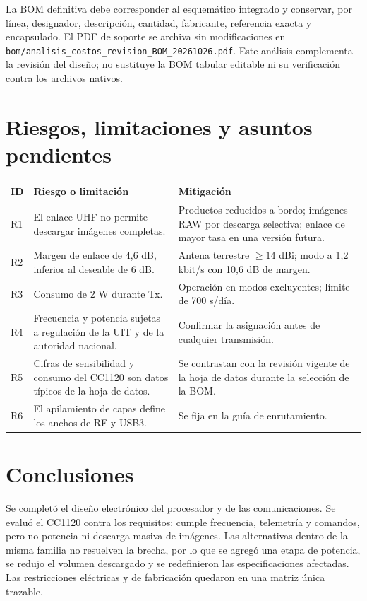 \documentclass[11pt,letterpaper]{article}
\begin{document}
La BOM definitiva debe corresponder al esquemático integrado y conservar, por línea, designador, descripción, cantidad, fabricante, referencia exacta y encapsulado. El PDF de soporte se archiva sin modificaciones en \texttt{bom/analisis\_costos\_revision\_BOM\_20261026.pdf}. Este análisis complementa la revisión del diseño; no sustituye la BOM tabular editable ni su verificación contra los archivos nativos.

\section{Riesgos, limitaciones y asuntos pendientes}
\label{sec:riesgos}
\begin{longtable}{L{1cm}L{6cm}L{6.2cm}}
\toprule ID & Riesgo o limitación & Mitigación \\
\midrule\endhead
R1 & El enlace UHF no permite descargar imágenes completas. & Productos reducidos a bordo; imágenes RAW por descarga selectiva; enlace de mayor tasa en una versión futura. \\
R2 & Margen de enlace de 4,6 dB, inferior al deseable de 6 dB. & Antena terrestre $\geq14$ dBi; modo a 1,2 kbit/s con 10,6 dB de margen. \\
R3 & Consumo de 2 W durante Tx. & Operación en modos excluyentes; límite de 700 s/día. \\
R4 & Frecuencia y potencia sujetas a regulación de la UIT y de la autoridad nacional. & Confirmar la asignación antes de cualquier transmisión. \\
R5 & Cifras de sensibilidad y consumo del CC1120 son datos típicos de la hoja de datos. & Se contrastan con la revisión vigente de la hoja de datos durante la selección de la BOM. \\
R6 & El apilamiento de capas define los anchos de RF y USB3. & Se fija en la guía de enrutamiento. \\
\bottomrule
\end{longtable}

\section{Conclusiones}
Se completó el diseño electrónico del procesador y de las comunicaciones. Se evaluó el CC1120 contra los requisitos: cumple frecuencia, telemetría y comandos, pero no potencia ni descarga masiva de imágenes. Las alternativas dentro de la misma familia no resuelven la brecha, por lo que se agregó una etapa de potencia, se redujo el volumen descargado y se redefinieron las especificaciones afectadas. Las restricciones eléctricas y de fabricación quedaron en una matriz única trazable.
\end{document}

